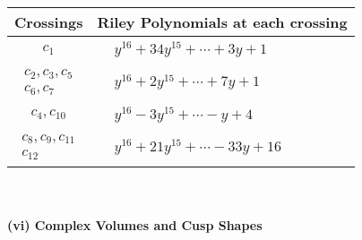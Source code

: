 \documentclass[1p]{elsarticle_modified}
\theoremstyle{definition}
\begin{document}
\begin{tabular}{m{50pt}|m{274pt}}
Crossings & \hspace{64pt}Riley Polynomials at each crossing \\
\hline $$\begin{aligned}c_{1}\end{aligned}$$&$\begin{aligned}
&y^{16}+34 y^{15}+\cdots+3 y+1
\end{aligned}$\\
\hline $$\begin{aligned}c_{2},c_{3},c_{5}\\c_{6},c_{7}\end{aligned}$$&$\begin{aligned}
&y^{16}+2 y^{15}+\cdots+7 y+1
\end{aligned}$\\
\hline $$\begin{aligned}c_{4},c_{10}\end{aligned}$$&$\begin{aligned}
&y^{16}-3 y^{15}+\cdots- y+4
\end{aligned}$\\
\hline $$\begin{aligned}c_{8},c_{9},c_{11}\\c_{12}\end{aligned}$$&$\begin{aligned}
&y^{16}+21 y^{15}+\cdots-33 y+16
\end{aligned}$\\
\hline
\end{tabular}\\~\\
\newpage\flushleft \textbf{(vi) Complex Volumes and Cusp Shapes}
\end{document}
